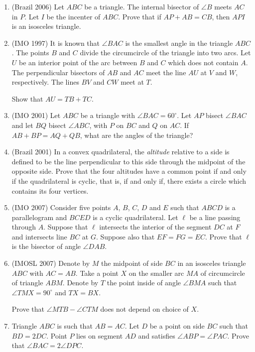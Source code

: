 \documentclass[10pt]{article}
\theoremstyle{definition}
\theoremstyle{remark}
\begin{document}
\begin{enumerate}
\item (Brazil 2006) Let $ABC$ be a triangle. The internal bisector of $\angle B$ meets $AC$ in $P$. Let $I$ be the incenter of $ABC$. Prove that if $AP+AB = CB$, then $API$ is an isosceles triangle.
 
\item (IMO 1997) It is known that $\angle BAC$ is the smallest angle in the triangle $ABC$. The points $B$ and $C$ divide the circumcircle of the triangle into two arcs. Let $U$ be an interior point of the arc between $B$ and $C$ which does not contain $A$. The perpendicular bisectors of $AB$ and $AC$ meet the line $AU$ at $V$ and $W$, respectively. The lines $BV$ and $CW$ meet at $T$.

Show that $AU = TB + TC$.

\item (IMO 2001) Let $ABC$ be a triangle with $\angle BAC = 60^\circ$. Let $AP$ bisect $\angle BAC$ and let $BQ$ bisect $\angle ABC$, with $P$ on $BC$ and $Q$ on $AC$. If $AB + BP = AQ + QB$, what are the angles of the triangle? 

\item (Brazil 2001) In a convex quadrilateral, the {\sl altitude} relative to a side is defined to be the line perpendicular to this side through the midpoint of the opposite side. Prove that the four altitudes have a common point if and only if the quadrilateral is cyclic, that is, if and only if, there exists a circle which contains its four vertices.

\item (IMO 2007) Consider five points $A$, $B$, $C$, $D$ and $E$ such that $ABCD$ is a parallelogram and $BCED$ is a cyclic quadrilateral. Let $\ell$ be a line passing through $A$. Suppose that $\ell$ intersects the interior of the segment $DC$ at $F$ and intersects line $BC$ at $G$. Suppose also that $EF = FG = EC$. Prove that $\ell$ is the bisector of angle $\angle DAB$.

\item (IMOSL 2007) Denote by $M$ the midpoint of side $BC$ in an isosceles triangle $ABC$ with $AC = AB$. Take a point $X$ on the smaller arc $MA$ of circumcircle of triangle $ABM$. Denote by $T$ the point inside of angle $\angle BMA$ such that $\angle TMX = 90^\circ$ and $TX = BX$.

Prove that $\angle MTB - \angle CTM$ does not depend on choice of $X$.

\item Triangle $ABC$ is such that $AB = AC$. Let $D$ be a point on side $BC$ such that $BD = 2DC$. Point $P$ lies on segment $AD$ and satisfies $\angle ABP = \angle PAC$. Prove that $\angle BAC = 2\angle DPC$.


\end{enumerate}
\end{document}
